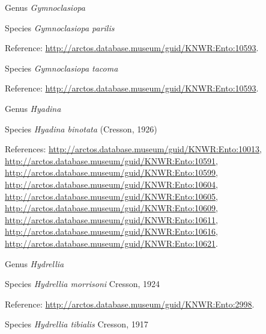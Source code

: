 \documentclass[9pt, article]{memoir}
\begin{document}
\begin{multicols}{2}
\vspace{6pt}\noindent\hspace{30pt}Genus \textit{Gymnoclasiopa}


\vspace{6pt}\noindent\hspace{36pt}Species \textit{Gymnoclasiopa parilis}


\vspace{6pt}Reference: 
\url{http://arctos.database.museum/guid/KNWR:Ento:10593}.

\vspace{6pt}\noindent\hspace{36pt}Species \textit{Gymnoclasiopa tacoma}


\vspace{6pt}Reference: 
\url{http://arctos.database.museum/guid/KNWR:Ento:10593}.

\vspace{6pt}\noindent\hspace{30pt}Genus \textit{Hyadina}


\vspace{6pt}\noindent\hspace{36pt}Species \textit{Hyadina binotata} (Cresson, 1926)


\vspace{6pt}References: 
\url{http://arctos.database.museum/guid/KNWR:Ento:10013}, 
\url{http://arctos.database.museum/guid/KNWR:Ento:10591}, 
\url{http://arctos.database.museum/guid/KNWR:Ento:10599}, 
\url{http://arctos.database.museum/guid/KNWR:Ento:10604}, 
\url{http://arctos.database.museum/guid/KNWR:Ento:10605}, 
\url{http://arctos.database.museum/guid/KNWR:Ento:10609}, 
\url{http://arctos.database.museum/guid/KNWR:Ento:10611}, 
\url{http://arctos.database.museum/guid/KNWR:Ento:10616}, 
\url{http://arctos.database.museum/guid/KNWR:Ento:10621}.

\vspace{6pt}\noindent\hspace{30pt}Genus \textit{Hydrellia}


\vspace{6pt}\noindent\hspace{36pt}Species \textit{Hydrellia morrisoni} Cresson, 1924


\vspace{6pt}Reference: 
\url{http://arctos.database.museum/guid/KNWR:Ento:2998}.

\vspace{6pt}\noindent\hspace{36pt}Species \textit{Hydrellia tibialis} Cresson, 1917



\end{multicols}
\end{document}
